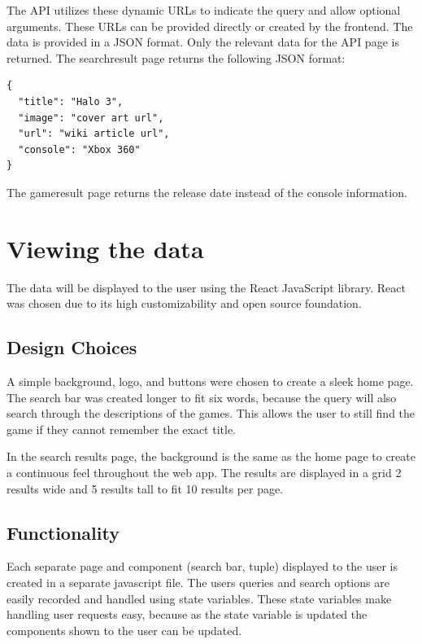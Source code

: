 The API utilizes these dynamic URLs to indicate the query and allow optional arguments. These URLs can be provided directly or created by the frontend. The data is provided in a JSON format. Only the relevant data for the API page is returned. The searchresult page returns the following JSON format:

\begin{minipage}[H]{\textwidth}
\begin{verbatim}
{
  "title": "Halo 3",
  "image": "cover art url",
  "url": "wiki article url",
  "console": "Xbox 360"
}
\end{verbatim}
\end{minipage}

The gameresult page returns the release date instead of the console information.

\section{Viewing the data}
The data will be displayed to the user using the React JavaScript library. React was chosen due to its high customizability and open source foundation. 

\subsection{Design Choices}
A simple background, logo, and buttons were chosen to create a sleek home page. The search bar was created longer to fit six words, because the query will also search through the descriptions of the games. This allows the user to still find the game if they cannot remember the exact title. 

In the search results page, the background is the same as the home page to create a continuous feel throughout the web app. The results are displayed in a grid 2 results wide and 5 results tall to fit 10 results per page. 

\subsection{Functionality}
Each separate page and component (search bar, tuple) displayed to the user is created in a separate javascript file. The users queries and search options are easily recorded and handled using state variables. These state variables make handling user requests easy, because as the state variable is updated the components shown to the user can be updated. 

